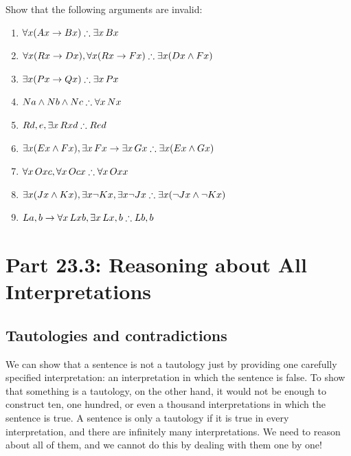 \problempart
Show that the following arguments are invalid:
\begin{enumerate}
\item $\forall x(\atom{A}{x} \eif \atom{B}{x}) \therefore \exists x\, \atom{B}{x}$
\item $\forall x(\atom{R}{x} \eif \atom{D}{x}), \forall x(\atom{R}{x} \eif \atom{F}{x}) \therefore \exists x(\atom{D}{x} \eand \atom{F}{x})$
\item $\exists x(\atom{P}{x}\eif \atom{Q}{x}) \therefore \exists x\, \atom{P}{x}$
\item $\atom{N}{a} \eand \atom{N}{b} \eand \atom{N}{c} \therefore \forall x\, \atom{N}{x}$
\item $\atom{R}{d,e}, \exists x\, \atom{R}{xd} \therefore \atom{R}{ed}$
\item $\exists x(\atom{E}{x} \eand \atom{F}{x}), \exists x\, \atom{F}{x} \eif \exists x\, \atom{G}{x} \therefore \exists x(\atom{E}{x} \eand \atom{G}{x})$
\item $\forall x\, \atom{O}{xc}, \forall x\, \atom{O}{cx} \therefore \forall x\, \atom{O}{xx}$
\item $\exists x(\atom{J}{x} \eand \atom{K}{x}), \exists x \enot \atom{K}{x}, \exists x \enot \atom{J}{x} \therefore \exists x(\enot \atom{J}{x} \eand \enot \atom{K}{x})$
\item $\atom{L}{a,b} \eif \forall x\, \atom{L}{xb}, \exists x\, \atom{L}{x,b} \therefore \atom{L}{b,b}$
\end{enumerate}



\section{Part 23.3: Reasoning about All Interpretations}
\label{allinterp}
\subsection{Tautologies and contradictions}

We can show that a sentence is not a tautology just by providing one carefully specified interpretation: an interpretation in which the sentence is false. To show that something is a tautology, on the other hand, it would not be enough to construct ten, one hundred, or even a thousand interpretations in which the sentence is true. A sentence is only a tautology if it is true in every interpretation, and there are infinitely many interpretations. We need to reason about all of them, and we cannot do this by dealing with them one by one!


